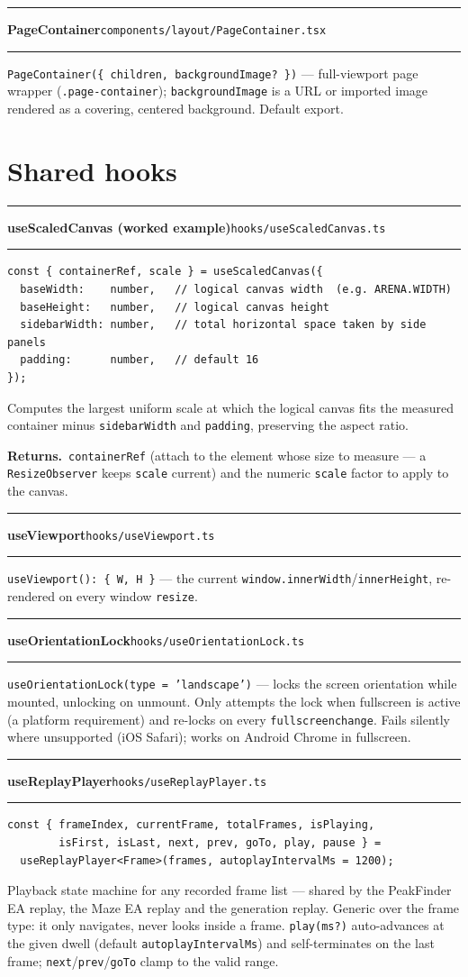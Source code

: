 \documentclass[11pt,a4paper]{report}
\newcommand{\srcfile}[1]{\texttt{\small #1}}   %
\newcommand{\ts}[1]{\texttt{#1}}               %
\newenvironment{apientry}[2]{%
  \par\medskip\noindent
  \begin{minipage}{\textwidth}
  \hrule\vspace{0.6ex}
  {\large\ttfamily\bfseries #1}\hfill{\footnotesize\srcfile{#2}}
  \vspace{0.4ex}\hrule\medskip
}{%
  \end{minipage}\par\medskip
}
\newcommand{\apifield}[1]{\par\smallskip\noindent\textbf{#1.}\ }
\begin{document}
\begin{apientry}{PageContainer}{components/layout/PageContainer.tsx}
\ts{PageContainer(\{ children, backgroundImage? \})} --- full-viewport
page wrapper (\ts{.page-container}); \ts{backgroundImage} is a URL or
imported image rendered as a covering, centered background. Default
export.
\end{apientry}

\section{Shared hooks}

\begin{apientry}{useScaledCanvas (worked example)}{hooks/useScaledCanvas.ts}
\begin{lstlisting}
const { containerRef, scale } = useScaledCanvas({
  baseWidth:    number,   // logical canvas width  (e.g. ARENA.WIDTH)
  baseHeight:   number,   // logical canvas height
  sidebarWidth: number,   // total horizontal space taken by side panels
  padding:      number,   // default 16
});
\end{lstlisting}
Computes the largest uniform scale at which the logical canvas fits the
measured container minus \ts{sidebarWidth} and \ts{padding}, preserving
the aspect ratio.
\apifield{Returns}\ts{containerRef} (attach to the element whose size to
measure --- a \ts{ResizeObserver} keeps \ts{scale} current) and the
numeric \ts{scale} factor to apply to the canvas.
\end{apientry}

\begin{apientry}{useViewport}{hooks/useViewport.ts}
\ts{useViewport(): \{ W, H \}} --- the current
\ts{window.innerWidth}/\ts{innerHeight}, re-rendered on every window
\ts{resize}.
\end{apientry}

\begin{apientry}{useOrientationLock}{hooks/useOrientationLock.ts}
\ts{useOrientationLock(type = 'landscape')} --- locks the screen
orientation while mounted, unlocking on unmount. Only attempts the lock
when fullscreen is active (a platform requirement) and re-locks on every
\ts{fullscreenchange}. Fails silently where unsupported (iOS Safari);
works on Android Chrome in fullscreen.
\end{apientry}

\begin{apientry}{useReplayPlayer}{hooks/useReplayPlayer.ts}
\begin{lstlisting}
const { frameIndex, currentFrame, totalFrames, isPlaying,
        isFirst, isLast, next, prev, goTo, play, pause } =
  useReplayPlayer<Frame>(frames, autoplayIntervalMs = 1200);
\end{lstlisting}
Playback state machine for any recorded frame list --- shared by the
PeakFinder EA replay, the Maze EA replay and the generation replay.
Generic over the frame type: it only navigates, never looks inside a
frame. \ts{play(ms?)} auto-advances at the given dwell (default
\ts{autoplayIntervalMs}) and self-terminates on the last frame;
\ts{next}/\ts{prev}/\ts{goTo} clamp to the valid range.
\end{apientry}
\end{document}
